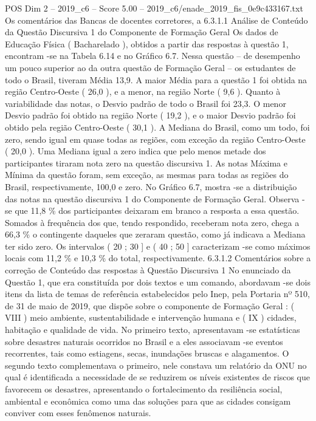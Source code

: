 \begin{textsample}{POS Dim 2 – 2019\_c6 – Score 5.00 – 2019\_c6/enade\_2019\_fis\_0e9c433167.txt}
Os comentários das Bancas de docentes corretores, a 6.3.1.1 Análise de Conteúdo da Questão Discursiva 1 do Componente de Formação Geral Os dados de Educação Física ( Bacharelado ), obtidos a partir das respostas à questão 1, encontram -se na Tabela 6.14 e no Gráfico 6.7.
Nessa questão – de desempenho um pouco superior ao da outra questão de Formação Geral – os estudantes de todo o Brasil, tiveram Média 13,9.
A maior Média para a questão 1 foi obtida na região Centro-Oeste ( 26,0 ), e a menor, na região Norte ( 9,6 ).
Quanto à variabilidade das notas, o Desvio padrão de todo o Brasil foi 23,3.
O menor Desvio padrão foi obtido na região Norte ( 19,2 ), e o maior Desvio padrão foi obtido pela região Centro-Oeste ( 30,1 ).
A Mediana do Brasil, como um todo, foi zero, sendo igual em quase todas as regiões, com exceção da região Centro-Oeste ( 20,0 ).
Uma Mediana igual a zero indica que pelo menos metade dos participantes tiraram nota zero na questão discursiva 1.
As notas Máxima e Mínima da questão foram, sem exceção, as mesmas para todas as regiões do Brasil, respectivamente, 100,0 e zero.
No Gráfico 6.7, mostra -se a distribuição das notas na questão discursiva 1 do Componente de Formação Geral.
Observa -se que 11,8 \% dos participantes deixaram em branco a resposta a essa questão.
Somados à frequência dos que, tendo respondido, receberam nota zero, chega a 66,3 \% o contingente daqueles que zeraram questão, como já indicava a Mediana ter sido zero.
Os intervalos ( 20 ; 30 ] e ( 40 ; 50 ] caracterizam -se como máximos locais com 11,2 \% e 10,3 \% do total, respectivamente. 6.3.1.2 Comentários sobre a correção de Conteúdo das respostas à Questão Discursiva 1 No enunciado da Questão 1, que era constituída por dois textos e um comando, abordavam -se dois itens da lista de temas de referência estabelecidos pelo Inep, pela Portaria nº 510, de 31 de maio de 2019, que dispõe sobre o componente de Formação Geral : ( VIII ) meio ambiente, sustentabilidade e intervenção humana e ( IX ) cidades, habitação e qualidade de vida.
No primeiro texto, apresentavam -se estatísticas sobre desastres naturais ocorridos no Brasil e a eles associavam -se eventos recorrentes, tais como estiagens, secas, inundações bruscas e alagamentos.
O segundo texto complementava o primeiro, nele constava um relatório da ONU no qual é identificada a necessidade de se reduzirem os níveis existentes de riscos que favorecem os desastres, apresentando o fortalecimento da resiliência social, ambiental e econômica como uma das soluções para que as cidades consigam conviver com esses fenômenos naturais.

\end{textsample}
